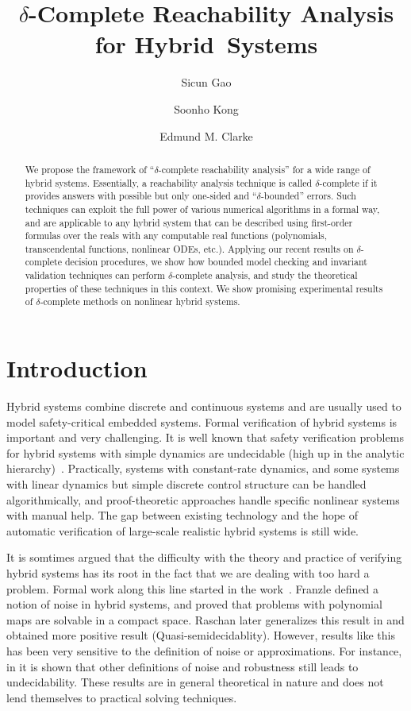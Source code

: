 \documentclass[envcountsect]{llncs}
\title{$\delta$-Complete Reachability Analysis for Hybrid~Systems}
\author{Sicun Gao \and Soonho Kong \and Edmund M. Clarke}
\institute{Carnegie Mellon University, Pittsburgh, PA 15213}
\begin{document}
\maketitle

\begin{abstract}
We propose the framework of ``$\delta$-complete reachability analysis'' for a
wide range of hybrid systems. Essentially, a reachability analysis technique is
called $\delta$-complete if it provides answers with possible but only
one-sided and ``$\delta$-bounded'' errors. Such techniques can exploit the full
power of various numerical algorithms in a formal way, and are applicable to any
hybrid system that can be described using first-order formulas over the reals
with any computable real functions (polynomials, transcendental functions,
nonlinear ODEs, etc.). Applying our recent results on $\delta$-complete decision
procedures, we show how bounded model checking and invariant validation
techniques can perform $\delta$-complete analysis, and study the theoretical
properties of these techniques in this context. We show promising experimental
results of $\delta$-complete methods on nonlinear hybrid systems. 
\end{abstract}

\section{Introduction}

Hybrid systems combine discrete and continuous systems and are usually used to
model safety-critical embedded systems. Formal verification of hybrid systems is
important and very challenging. It is well known that safety verification
problems for hybrid systems with simple dynamics are undecidable (high up in the
analytic hierarchy)~\cite{}. Practically, systems with constant-rate dynamics,
and some systems with linear dynamics but simple discrete control structure can
be handled algorithmically, and proof-theoretic approaches handle specific
nonlinear systems with manual help. The gap between existing technology and
the hope of automatic verification of large-scale realistic hybrid systems is
still wide. 

It is somtimes argued that the difficulty with the theory and practice
of verifying hybrid systems has its root in the fact that we are dealing with
too hard a problem. Formal work along this line started in the work~\cite{}.
Franzle defined a notion of noise in hybrid systems, and proved that problems
with polynomial maps are solvable in a compact space. Raschan later generalizes
this result in \cite{} and obtained more positive result
(Quasi-semidecidablity). However, results like this has been very sensitive to
the definition of noise or approximations. For instance, in \cite{} it is shown
that other definitions of noise and robustness still leads to undecidability.
These results are in general theoretical in nature and does not lend themselves
to practical solving techniques. 
\end{document}
